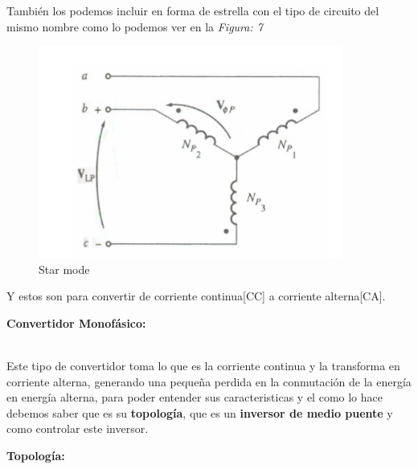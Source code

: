 \documentclass[a3paper,12pt]{article}
\begin{document}
{\begin{flushleft}
\begin{LARGE}
También los podemos incluir en forma de estrella con el tipo de circuito del mismo nombre como lo podemos ver en la \textit{Figura: 7}\\
\begin{figure}[hbtp]
\centering
\includegraphics[width=10cm]{star.png}
\caption{Star mode}
\end{figure}
\vspace{1cm}

Y estos son para convertir de corriente continua[CC] a corriente alterna[CA].
\pagebreak

\hspace{3cm}\begin{huge}\textbf{Convertidor Monofásico: }\end{huge}\\


Este tipo de convertidor toma lo que es la corriente continua y la transforma en corriente alterna, generando una pequeña perdida en la conmutación de la energía en energía alterna, para poder entender sus caracteristicas y el como lo hace debemos saber que es su \textbf{topología}, que es un \textbf{inversor de medio puente} y como controlar este inversor.\\
\vspace{.7cm}
\begin{Huge}
	\hspace{3cm} \textbf{Topología: }\\
		\vspace{.3cm}
		

\end{Huge}
\end{LARGE}
\end{flushleft}}
\end{document}
